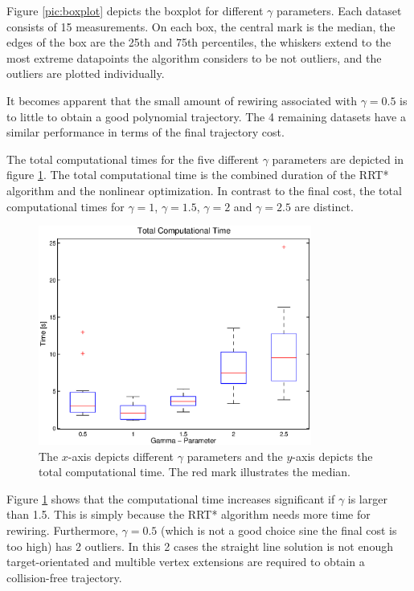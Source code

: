 Figure \ref{pic:boxplot} depicts the boxplot for different $\gamma$ parameters. Each dataset consists of 15 measurements. On each box, the central mark is the median, the edges of the box are the 25th and 75th percentiles, the whiskers extend to the most extreme
datapoints the algorithm considers to be not outliers, and the outliers are plotted individually. \newline





It becomes apparent that the small amount of rewiring associated with $\gamma = 0.5$ is to little to obtain a good polynomial trajectory. The 4 remaining datasets have a similar performance in terms of the final trajectory cost. \newline

The total computational times for the five different $\gamma$ parameters are depicted in figure \ref{pic:boxplot_time}. The total computational time is the combined duration of the RRT* algorithm and the nonlinear optimization.  In contrast to the final cost, the total computational times for $\gamma = 1 $, $\gamma = 1.5$, $\gamma = 2$ and $\gamma = 2.5$ are distinct. 

\begin{figure}[h]
   \centering
   \includegraphics[trim = 14mm 10mm 15mm 0mm,clip,width=0.8\textwidth]{pics/boxplot_time.eps}
   \caption{The $x$-axis depicts different $\gamma$ parameters and the $y$-axis depicts the total computational time. The red mark illustrates the median.}
   \label{pic:boxplot_time}
\end{figure}

Figure \ref{pic:boxplot_time} shows that the computational time increases significant if $\gamma$ is larger than 1.5. This is simply because the RRT* algorithm needs more time for rewiring. Furthermore, $\gamma = 0.5$ (which is not a good choice sine the final cost is too high) has 2 outliers. In this 2 cases the straight line solution is not enough target-orientated and multible vertex extensions are required to obtain a collision-free trajectory. \newline

